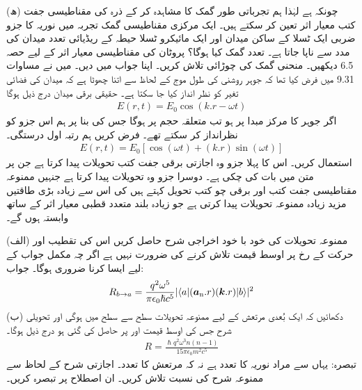 (ھ) چونکہ  ہے لہٰذا ہم تجرباتی طور گمک کا مشاہدہ کر کے ذرہ کی مقناطیسی جفت کتب معیار اثر تعین کر سکتے ہیں۔ ایک مرکزی مقناطیسی گمک تجربہ میں نوریہ کا  جزو ضربی ایک ٹسلا کے ساکن میدان اور ایک مائیکرو  ٹسلا حیطہ کے ریڈیائی تعدد میدان کی مدد سے ناپا جاتا ہے۔ تعدد گمک کیا ہوگا؟ پروٹان کی مقناطیسی معیار اثر کے لیے حصہ  \num{6.5} دیکھیں۔ منحنی گمک کی چوڑائی تلاش کریں۔ اپنا جواب  میں دیں۔
میں نے مساوات \num{9.31} میں فرض کیا تھا کہ جوہر روشنی کی طول موج کے لحاظ سے اتنا چھوٹا ہے کہ میدان کی فضائی تغیر کو نظر انداز کیا جا سکتا ہے۔ حقیقی برقی میدان درج ذیل ہوگا
\begin{align}
	E(r,t) = E_0\cos(k.r-\omega t)
\end{align}
اگر جوہر کا مرکز مبدا پر ہو تب متعلقہ حجم پر   ہوگا جس کی بنا پر ہم اس جزو کو نظرانداز کر سکتے تھے۔ فرض کریں ہم رتبہ اول درستگی۔
\begin{align}
	E(r,t) = E_0[\cos(\omega t)+(k.r)\sin(\omega t)]
\end{align}
استعمال کریں۔ اس کا پہلا جزو وہ اجازتی برقی جفت کتب تحویلات پیدا کرتا ہے جن پر متن میں بات کی چکی ہے۔ دوسرا جزو وہ تحویلات پیدا کرتا ہے جنہیں ممنوعہ مقناطیسی جفت کتب اور برقی چو کتب تحویل کہتے ہیں  کی اس سے زیادہ بڑی طاقتیں مزید زیادہ ممنوعہ تحویلات پیدا کرتی ہے جو زیادہ بلند متعدد قطبی معیار اثر کے ساتھ وابستہ ہوں گے۔

(الف) ممنوعہ تحویلات کی خود با خود اخراجی شرح حاصل کریں اس کی تقطیب اور حرکت کے رخ پر اوسط قیمت تلاش کرنے کی ضرورت نہیں ہے اگر چہ مکمل جواب کے لیے ایسا کرنا ضروری ہوگا۔ جواب:
\begin{align}
	R_{b\to a} = \frac{q^2\omega^5}{\pi\epsilon_0\hslash c^5}|\langle a|({{\boldsymbol{a}}_{\textup{n}}}.r)({\boldsymbol{k}}.r)|b \rangle|^2
\end{align}
(ب) دکھائیں کہ ایک بُعدی مرتعش کے لیے ممنوعہ تحویلات سطح  سے سطح  میں ہوگی اور تحویلی شرح جس کی اوسط قیمت  اور  پر حاصل کی گئی ہو درج ذیل ہوگا۔
\begin{align}
	R = \frac{\hslash q^2\omega^3n(n-1)}{15\pi\epsilon_0m^2c^5}
\end{align}
تبصرہ: یہاں  سے مراد نوریہ کا تعدد ہے نہ کہ مرتعش کا تعدد۔ اجازتی شرح کے لحاظ سے ممنوعہ شرح کی  نسبت  تلاش کریں۔ ان اصطلاح پر تبصرہ کریں۔


